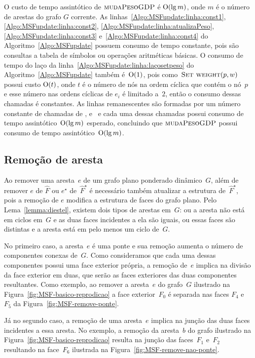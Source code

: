 O custo de tempo assintótico de $\text{\scshape mudaPesoGDP}$ é $\mathrm{O}(\lg m)$, onde $m$ é o número de arestas do grafo $G$ corrente.
As linhas~\ref{Algo:MSFupdate:linha:const1}, \ref{Algo:MSFupdate:linha:const2}, \ref{Algo:MSFupdate:linha:atualizaPeso}, \ref{Algo:MSFupdate:linha:const3} e~\ref{Algo:MSFupdate:linha:const4} do Algoritmo~\ref{Algo:MSFupdate} possuem consumo de tempo constante, pois são consultas a tabela de símbolos ou operações aritméticas básicas.
O consumo de tempo do laço da linha~\ref{Algo:MSFupdate:linha:laçosetpeso} do Algoritmo~\ref{Algo:MSFupdate} também é~$\mathrm{O}(1)$, pois como~$\text{\scshape Set weight}(p, w)$ possui custo $\mathrm{O}(t)$, onde $t$ é o número de nós na ordem cíclica que contém o nó~$p$ e esse número nas ordens cíclicas de $e_i$ é limitado a~$2$, então o consumo dessas chamadas é constantes.
As linhas remanescentes são formadas por um número constante de chamadas de \LCOFindNode, \LCOMerge{} e~\LCOSplit{} e cada uma dessas chamadas possui consumo de tempo assintótico~$\mathrm{O}(\lg m)$ esperado, concluindo que $\text{\scshape mudaPesoGDP}$ possui consumo de tempo assintótico~$\mathrm{O}(\lg m)$.

\subsection{Remoção de aresta}

Ao remover uma aresta~$e$ de um grafo plano ponderado dinâmico~$G$, além de remover $e$ de $\hat F$ ou $e^\star$ de~$\hat F^\star$ é necessário também atualizar a estrutura de~$\hat F^\star$, pois a remoção de $e$ modifica a estrutura de faces do grafo plano.
Pelo Lema~\ref{lemma:diestel}, existem dois tipos de arestas em~$G$: ou a aresta não está em ciclos em~$G$ e as duas faces incidentes a ela são iguais, ou essas faces são distintas e a aresta está em pelo menos um ciclo de~$G$.

No primeiro caso, a aresta~$e$ é uma ponte e sua remoção aumenta o número de componentes conexas de~$G$.
Como consideramos que cada uma dessas componentes possui uma face exterior própria, a remoção de~$e$ implica na divisão da face exterior em duas, que serão as faces exteriores das duas componentes resultantes.
Como exemplo, ao remover a aresta~$e$ do grafo~$G$ ilustrado na Figura~\ref{fig:MSF-basico-reprodicao} a face exterior~$F_0$ é separada nas faces $F_4$ e~$F_5$ da Figura~\ref{fig:MSF-remove-ponte}.


Já no segundo caso, a remoção de uma aresta~$e$ implica na junção das duas faces incidentes a essa aresta.
No exemplo, a remoção da aresta~$b$ do grafo ilustrado na Figura~\ref{fig:MSF-basico-reprodicao} resulta na junção das faces~$F_1$ e~$F_2$ resultando na face~$F_6$ ilustrada na Figura~\ref{fig:MSF-remove-nao-ponte}.

